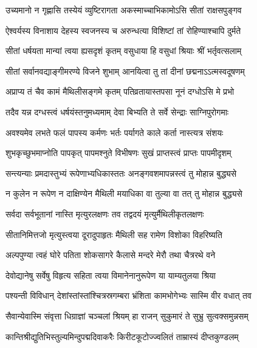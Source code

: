 \twolineshloka
{उच्यमानो न गृह्णासि तस्येयं व्युष्टिरागता}
{अकस्माच्चाभिकामोऽसि सीतां राक्षसपुङ्गव} %

\twolineshloka
{ऐश्वर्यस्य विनाशाय देहस्य स्वजनस्य च}
{अरुन्धत्या विशिष्टां तां रोहिण्याश्चापि दुर्मते} %

\twolineshloka
{सीतां धर्षयता मान्यां त्वया ह्यसदृशं कृतम्}
{वसुधाया हि वसुधां श्रियाः श्रीं भर्तृवत्सलाम्} %

\twolineshloka
{सीतां सर्वानवद्याङ्गीमरण्ये विजने शुभाम्}
{आनयित्वा तु तां दीनां छद्मनाऽऽत्मस्वदूषणम्} %

\twolineshloka
{अप्राप्य तं चैव कामं मैथिलीसङ्गमे कृतम्}
{पतिव्रतायास्तपसा नूनं दग्धोऽसि मे प्रभो} %

\twolineshloka
{तदैव यन्न दग्धस्त्वं धर्षयंस्तनुमध्यमाम्}
{देवा बिभ्यति ते सर्वे सेन्द्राः साग्निपुरोगमाः} %

\twolineshloka
{अवश्यमेव लभते फलं पापस्य कर्मणः}
{भर्तः पर्यागते काले कर्ता नास्त्यत्र संशयः} %

\twolineshloka
{शुभकृच्छुभमाप्नोति पापकृत् पापमश्नुते}
{विभीषणः सुखं प्राप्तस्त्वं प्राप्तः पापमीदृशम्} %

\twolineshloka
{सन्त्यन्याः प्रमदास्तुभ्यं रूपेणाभ्यधिकास्ततः}
{अनङ्गवशमापन्नस्त्वं तु मोहान्न बुद्ध्यसे} %

\twolineshloka
{न कुलेन न रूपेण न दाक्षिण्येन मैथिली}
{मयाधिका वा तुल्या वा तत् तु मोहान्न बुद्ध्यसे} %

\twolineshloka
{सर्वदा सर्वभूतानां नास्ति मृत्युरलक्षणः}
{तव तद्वदयं मृत्युर्मैथिलीकृतलक्षणः} %

\twolineshloka
{सीतानिमित्तजो मृत्युस्त्वया दूरादुपाहृतः}
{मैथिली सह रामेण विशोका विहरिष्यति} %

\twolineshloka
{अल्पपुण्या त्वहं घोरे पतिता शोकसागरे}
{कैलासे मन्दरे मेरौ तथा चैत्ररथे वने} %

\twolineshloka
{देवोद्यानेषु सर्वेषु विहृत्य सहिता त्वया}
{विमानेनानुरूपेण या याम्यतुलया श्रिया} %

\twolineshloka
{पश्यन्ती विविधान् देशांस्तांस्तांश्चित्रस्रगम्बरा}
{भ्रंशिता कामभोगेभ्यः सास्मि वीर वधात् तव} %

\twolineshloka
{सैवान्येवास्मि संवृत्ता धिग्राज्ञां चञ्चलां श्रियम्}
{हा राजन् सुकुमारं ते सुभ्रु सुत्वक्समुन्नसम्} %

\twolineshloka
{कान्तिश्रीद्युतिभिस्तुल्यमिन्दुपद्मदिवाकरैः}
{किरीटकूटोज्ज्वलितं ताम्रास्यं दीप्तकुण्डलम्} %

